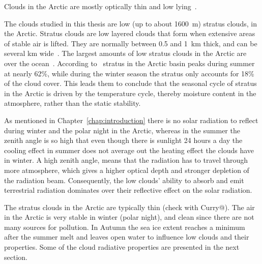 Clouds in the Arctic are mostly optically thin and low lying~\citep{Curry1996}.


The clouds studied in this thesis are low (up to about 1600~m) stratus clouds, in the Arctic. Stratus clouds are low layered clouds that form when extensive areas of stable air is lifted. They are normally between 0.5 and 1~km thick, and can be several km wide~\citep{Aguado2010}. The largest amounts of low stratus clouds in the Arctic are over the ocean~\citep{Klein1993}.
According to~\citet{Klein1993} stratus in the Arctic basin peaks during summer at nearly 62\%, while during the winter season the stratus only accounts for 18\% of the cloud cover. This leads them to conclude that the seasonal cycle of stratus in the Arctic is driven by the temperature cycle, thereby moisture content in the atmosphere, rather than the static stability.

As mentioned in Chapter~\ref{chap:introduction} there is no solar radiation to reflect during winter and the polar night in the Arctic, whereas in the summer the zenith angle is so high that even though there is sunlight 24 hours a day the cooling effect in summer does not average out the heating effect the clouds have in winter. A high zenith angle, means that the radiation has to travel through more atmosphere, which gives a higher optical depth and stronger depletion of the radiation beam. Consequently, the low clouds' ability to absorb and emit terrestrial radiation dominates over their reflective effect on the solar radiation.



The stratus clouds in the Arctic are typically thin (check with Curry@).
The air in the Arctic is very stable in winter (polar night), and clean since there are not many sources for pollution. In Autumn the sea ice extent reaches a minimum after the summer melt and leaves open water to influence low clouds and their properties. Some of the cloud radiative properties  are presented in the next section.